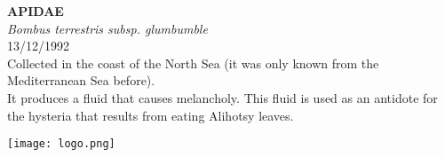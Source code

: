 \documentclass[
  landscape]{article}
\begin{document}
\begin{mdframed}[linecolor=mycolortext, linewidth=2pt, backgroundcolor=mycolor]

  \bigskip
  \begin{flushright}
  \begin{minipage}[t][-50ex][t]{16em}  
  \end{minipage}
  \end{flushright}
  \bigskip
  \begin{adjustwidth}{1cm}{1cm}
  {\fontsize{50pt}{0pt}\selectfont\bf\textcolor{mycolortext}{ APIDAE }} \\
  \linebreak
  \linebreak
  {\fontsize{40pt}{100pt}\selectfont\textcolor{mycolortext}{\emph{ Bombus terrestris subsp. glumbumble }}} \\
  \vfill
  {\fontsize{30pt}{100pt}\selectfont\textcolor{mycolortext}{ 13/12/1992 }} \\
  \vfill
  {\fontsize{30pt}{100pt}\selectfont\textcolor{mycolortext}{ Collected in the coast of the North Sea (it was only known from the Mediterranean Sea before). }} \\
  \vfill
  {\fontsize{30pt}{50pt}\selectfont\textcolor{mycolortext}{ It produces a fluid that causes melancholy. This fluid is used as an antidote for the hysteria that results from eating Alihotsy leaves. }} \\
  \end{adjustwidth}
  \begin{center}
  \texttt{[image: logo.png]}
  \end{center}
  \end{mdframed}
  \pagebreak

\end{document}
